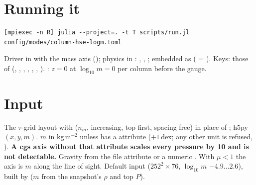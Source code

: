 


\section{Running it}
{\footnotesize\begin{verbatim}
[mpiexec -n R] julia --project=. -t T scripts/run.jl config/modes/column-hse-logm.toml
\end{verbatim}}
Driver  in  with the mass axis (); physics in
: , , ; embedded as
( = ). Keys: those of  (,
, \code{[eos]}, , \code{[view]}, \code{[output]}, ). : $z=0$ at
$\log_{10}m=0$ per column before the gauge.

\section{Input}
The $\tau$-grid layout with  ($n_m$, increasing, top first, spacing free) in place of ; h5py
$(x,y,m)$. $m$ in kg\,m$^{-2}$ unless  has a  attribute  ($+1$\,dex; any other unit is refused,
). \textbf{A cgs axis without that attribute scales every pressure by 10 and is not detectable.} Gravity from the
file attribute  or a numeric . With $\mu<1$ the axis is $m$ along the line of sight. Default input
 ($252^2\times76$, $\log_{10}m$ $-4.9\ldots2.6$), built by
 ($m$ from the snapshot's $\rho$ and top $P$).

